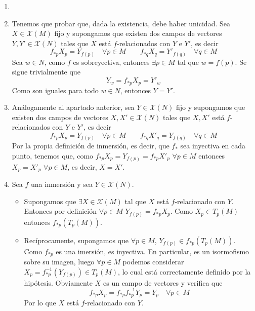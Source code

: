 \documentclass[twoside]{article}
\begin{document}
\begin{solucion}
\begin{enumerate}
\item[]
\item Tenemos que probar que, dada la existencia, debe haber unicidad. Sea $X\in\mathcal{X}(M)$ fijo y supongamos que existen dos campos de vectores $Y,Y'\in \mathcal{X}(N)$ tales que $X$ está $f$-relacionados con $Y$ e $Y'$, es decir
$$f_{\ast p}X_p = Y_{f(p)} \quad \forall p\in M \qquad
f_{\ast q}X_q = Y'_{f(q)} \quad \forall q\in M $$ 
Sea $w\in N$, como $f$ es sobreyectiva, entonces $\exists p \in M$ tal que $w=f(p)$. Se sigue trivialmente que
$$
Y_w = f_{\ast p}X_p = Y'_w
$$
Como son iguales para todo $w\in N$, entonces $Y=Y'$.
\item Análogamente al apartado anterior, sea $Y\in\mathcal{X}(N)$ fijo y supongamos que existen dos campos de vectores $X,X'\in \mathcal{X}(N)$ tales que $X,X'$ está $f$-relacionados con $Y$ e $Y'$, es decir
$$f_{\ast p}X_p = Y_{f(p)} \quad \forall p\in M \qquad
f_{\ast q}X'_q = Y_{f(q)} \quad \forall q\in M $$ 
Por la propia definición de inmersión, es decir, que $f_{\ast}$ sea inyectiva en cada punto, tenemos que, como $f_{\ast p}X_p = Y_{f(p)} = f_{\ast p}X'_p$ $\forall p\in M$ entonces $ X_p = X'_p$ $\forall p\in M$, es decir, $X=X'$.
\item Sea $f$ una inmersión y sea $Y \in \mathcal{X}(N)$.
\begin{itemize}
\item Supongamos que $\exists X \in \mathcal{X}(M)$ tal que $X$ está $f$-relacionado con $Y$. Entonces por definición $\forall p\in M$ $Y_{f(p)}=f_{\ast p}X_p$. Como $X_p\in T_p(M)$ entonces $f_{\ast p}(T_p(M))$.
\item Recíprocamente, supongamos que $\forall p \in M$, $Y_{f(p)}\in f_{\ast p}(T_p(M))$. Como $f_{\ast p}$ es una imersión, es inyectiva. En particular, es un isormofismo sobre su imagen, luego $\forall p\in M$ podemos considerar $X_p = f_{\ast p}^{-1}(Y_{f(p)})\in T_p(M)$, lo cual está correctamente definido por la hipótesis. Obviamente $X$ es un campo de vectores y verifica que
$$f_{\ast p} X_p = f_{\ast p} f_{\ast p}^{-1} Y_p = Y_p \quad \forall p \in M$$
Por lo que $X$ está $f$-relacionado con $Y$.
\end{itemize} 
\end{enumerate}
\end{solucion}
\end{document}
